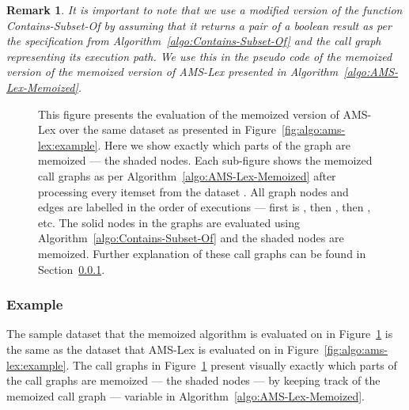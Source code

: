 \documentclass[13pt,a4paper]{article}
\newtheorem{remark}[theorem]{Remark}
\begin{document}
\begin{remark}
It is important to note that we use a modified version of the function Contains-Subset-Of by assuming that it returns a pair of a boolean result as per the specification from Algorithm~\ref{algo:Contains-Subset-Of} and the call graph representing its execution path. We use this in the pseudo code of the memoized version of the memoized version of AMS-Lex presented in Algorithm~\ref{algo:AMS-Lex-Memoized}.
\end{remark}


\begin{figure} [t]
	\centering
	\caption{ This figure presents the evaluation of the memoized version of AMS-Lex over the same dataset  as presented in Figure~\ref{fig:algo:ams-lex:example}. Here we show exactly which parts of the graph are memoized --- the shaded nodes. Each sub-figure shows the memoized call graphs  as per Algorithm~\ref{algo:AMS-Lex-Memoized} after processing every itemset  from the dataset . All graph nodes and edges are labelled in the order of executions --- first is , then , then , etc. The solid nodes in the graphs are evaluated using Algorithm~\ref{algo:Contains-Subset-Of} and the shaded nodes are memoized. Further explanation of these call graphs can be found in Section~\ref{sec:memoized:algo:example}. }
	\label{fig:algo:memoized:example}
\end{figure}

\subsubsection{Example}
\label{sec:memoized:algo:example}

The sample dataset that the memoized algorithm is evaluated on in Figure~\ref{fig:algo:memoized:example} is the same as the dataset that AMS-Lex is evaluated on in Figure~\ref{fig:algo:ams-lex:example}. The call graphs in Figure~\ref{fig:algo:memoized:example} present visually exactly which parts of the call graphs are memoized --- the shaded nodes --- by keeping track of the memoized call graph --- variable  in Algorithm~\ref{algo:AMS-Lex-Memoized}. 
\end{document}
